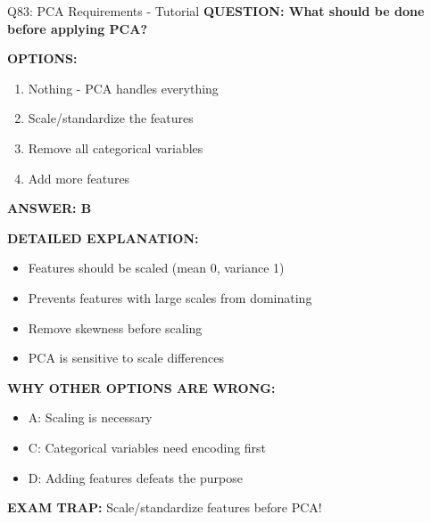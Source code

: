 \documentclass[8pt]{beamer}
\begin{document}
	\begin{frame}{Q83: PCA Requirements - Tutorial}
		\fontsize{6.5}{7.5}\selectfont
		\textbf{QUESTION: What should be done before applying PCA?}
		
		\vspace{0.1cm}
		\textbf{OPTIONS:}
		\begin{enumerate}
			\item Nothing - PCA handles everything
			\item Scale/standardize the features
			\item Remove all categorical variables
			\item Add more features
		\end{enumerate}
		
		\vspace{0.1cm}
		\textcolor{myblue}{\textbf{ANSWER: B}}
		
		\vspace{0.1cm}
		\textbf{DETAILED EXPLANATION:}
		\begin{itemize}
			\item Features should be scaled (mean 0, variance 1)
			\item Prevents features with large scales from dominating
			\item Remove skewness before scaling
			\item PCA is sensitive to scale differences
		\end{itemize}
		
		\vspace{0.1cm}
		\textcolor{myred}{\textbf{WHY OTHER OPTIONS ARE WRONG:}}
		\begin{itemize}
			\item \textcolor{myred}{A:} Scaling is necessary
			\item \textcolor{myred}{C:} Categorical variables need encoding first
			\item \textcolor{myred}{D:} Adding features defeats the purpose
		\end{itemize}
		
		\textcolor{myred}{\textbf{EXAM TRAP:}} \textcolor{myblue}{Scale/standardize} features before PCA!
	\end{frame}
	
\end{document}

